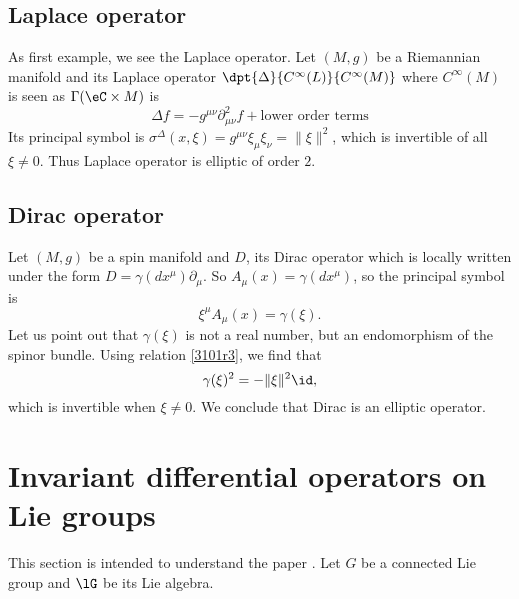 \subsection{Laplace operator}

As first example, we see the Laplace operator. Let $(M,g)$ be a Riemannian manifold and its Laplace operator $\dpt{ \Delta }{  C^{\infty}(L) }{  C^{\infty}(M) }$ where $ C^{\infty}(M)$ is seen as $\Gamma(\eC\times M)$ is
\[ 
  \Delta f=-g^{\mu\nu}\partial^2_{\mu\nu}f+\text{lower order terms}
\]
Its principal symbol is $\sigma^{\Delta}(x,\xi)=g^{\mu\nu}\xi_{\mu}\xi_{\nu}=\| \xi \|^2$, which is invertible of all $\xi\neq 0$. Thus Laplace operator is elliptic of order $2$.

\subsection{Dirac operator}

Let $(M,g)$ be a spin manifold and $D$, its Dirac operator which is locally written under the form $D=\gamma(dx^{\mu})\partial_{\mu}$. So $A_{\mu}(x)=\gamma(dx^{\mu})$, so the principal symbol is
\[ 
  \xi^{\mu}A_{\mu}(x)=\gamma(\xi).
\]
Let us point out that $\gamma(\xi)$ is not a real number, but an endomorphism of the spinor bundle. Using relation \eqref{3101r3}, we find that
\[ 
  \gamma(\xi)^2=-\| \xi \|^2\id,
\]
which is invertible when $\xi\neq 0$. We conclude that Dirac is an elliptic operator.

\section{Invariant differential operators on Lie groups}

This section is intended to understand the paper \cite{QuantifKhalerian}. Let $G$ be a connected Lie group and $\lG$ be its Lie algebra.

